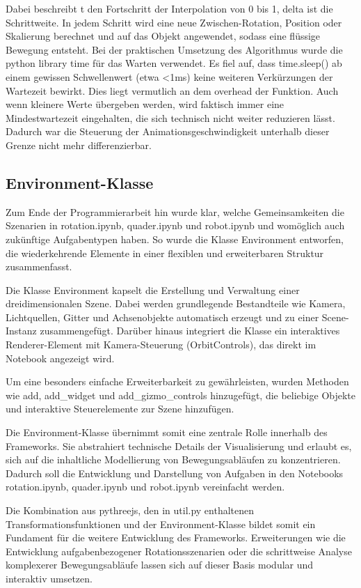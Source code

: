 Dabei beschreibt t den Fortschritt der Interpolation von 0 bis 1, delta ist die Schrittweite.
In jedem Schritt wird eine neue Zwischen-Rotation, Position oder Skalierung berechnet und auf das Objekt angewendet, sodass eine flüssige Bewegung entsteht.
Bei der praktischen Umsetzung des Algorithmus wurde die python library time für das Warten verwendet. Es fiel auf,
dass time.sleep() ab einem gewissen Schwellenwert (etwa <1ms) keine weiteren Verkürzungen der Wartezeit bewirkt.
Dies liegt vermutlich an dem overhead der Funktion. Auch wenn kleinere Werte übergeben werden,
wird faktisch immer eine Mindestwartezeit eingehalten, die sich technisch nicht weiter reduzieren lässt.
Dadurch war die Steuerung der Animationsgeschwindigkeit unterhalb dieser Grenze nicht mehr differenzierbar.

\subsection{Environment-Klasse}
Zum Ende der Programmierarbeit hin wurde klar, welche Gemeinsamkeiten die Szenarien in rotation.ipynb, quader.ipynb und robot.ipynb und womöglich auch zukünftige Aufgabentypen haben.
So wurde die Klasse Environment entworfen, die wiederkehrende Elemente in einer flexiblen und erweiterbaren Struktur zusammenfasst.

Die Klasse Environment kapselt die Erstellung und Verwaltung einer dreidimensionalen Szene.
Dabei werden grundlegende Bestandteile wie Kamera, Lichtquellen, Gitter und Achsenobjekte automatisch erzeugt und zu einer Scene-Instanz zusammengefügt.
Darüber hinaus integriert die Klasse ein interaktives Renderer-Element mit Kamera-Steuerung (OrbitControls),
das direkt im Notebook angezeigt wird.

Um eine besonders einfache Erweiterbarkeit zu gewährleisten, wurden Methoden wie add, add\_widget und add\_gizmo\_controls hinzugefügt,
die beliebige Objekte und interaktive Steuerelemente zur Szene hinzufügen.

Die Environment-Klasse übernimmt somit eine zentrale Rolle innerhalb des Frameworks.
Sie abstrahiert technische Details der Visualisierung und erlaubt es, sich auf die inhaltliche Modellierung von Bewegungsabläufen zu konzentrieren.
Dadurch soll die Entwicklung und Darstellung von Aufgaben in den Notebooks rotation.ipynb, quader.ipynb und robot.ipynb vereinfacht werden.

Die Kombination aus pythreejs, den in util.py enthaltenen Transformationsfunktionen und der Environment-Klasse bildet
somit ein Fundament für die weitere Entwicklung des Frameworks.
Erweiterungen wie die Entwicklung aufgabenbezogener Rotationsszenarien oder die schrittweise Analyse
komplexerer Bewegungsabläufe lassen sich auf dieser Basis modular und interaktiv umsetzen.


